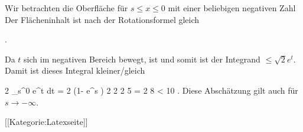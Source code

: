 Wir betrachten die Oberfläche für $s \leq x \leq 0$ mit einer beliebigen negativen Zahl
 Der Flächeninhalt ist nach der Rotationsformel gleich

 { . }

Da $t$ sich im negativen Bereich bewegt, ist
 und somit ist der Integrand $\leq \sqrt{2} e^t$. Damit ist dieses Integral kleiner/gleich

\mavergleichskettedisp
{\vergleichskette
{ 2 \pi {}  \int_s^0 e^t dt
}
{ =} { 2 \pi {} (1- e^s )
}
{ \leq} { 2 \pi {}
}
{ \leq} { 2 2 5
}
{ =} { 2 8
}
}
{
\vergleichskettefortsetzung
{ <} { 10
}
{ } {}
{ } {}
{ } {}
}{}{.}
Diese Abschätzung gilt auch für $s \rightarrow - \infty$.

 [[Kategorie:Latexseite]]
